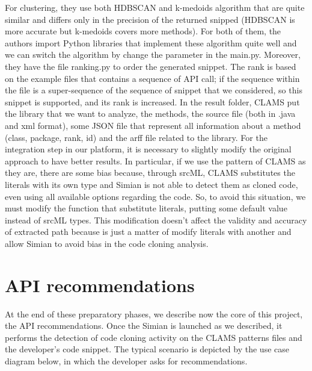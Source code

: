 For clustering, they use both HDBSCAN and k-medoids algorithm that are quite similar and differs only in the precision of the returned snipped (HDBSCAN is more accurate but k-medoids covers more methods). For both of them, the authors import Python libraries that implement these algorithm quite well and we can switch the algorithm by change the parameter in the main.py. Moreover, they have the file ranking.py to order the generated snippet. The rank is based on the example files that contains a sequence of API call; if the sequence within the file is a super-sequence of the sequence of snippet that we considered, so this snippet is supported, and its rank is increased. In the result folder, CLAMS put the library that we want to analyze, the methods, the source file (both in .java and xml format), some JSON file that represent all information about a method (class, package, rank, id) and the arff file related to the library. \newline
For the integration step in our platform, it is necessary to slightly modify the original approach to have better results. In particular, if we use the pattern of CLAMS as they are, there are some bias because, through srcML, CLAMS substitutes the literals with its own type and Simian is not able to detect them as cloned code, even using all available options regarding the code. So, to avoid this situation, we must modify the function that substitute literals, putting some default value instead of srcML types. This modification doesn't affect the validity and accuracy of extracted path because is just a matter of modify literals with another and allow Simian to avoid bias in the code cloning analysis.

\section{API recommendations}
At the end of these preparatory phases, we describe now the core of this project, the API recommendations. Once the Simian is launched as we described, it performs the detection of code cloning activity on the CLAMS patterns files and the developer's code snippet. The typical scenario is depicted by the use case diagram below, in which the developer asks for recommendations.


